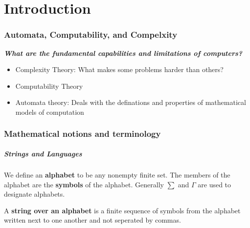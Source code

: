 \chapter{Introduction}

\subsection{Automata, Computability, and Compelxity}

\textit{\textbf{What are the fundamental capabilities and limitations of 
computers?}}\\

\begin{itemize}
    \item Complexity Theory: What makes some problems harder than others?
    \item Computability Theory
    \item Automata theory: Deals with the definations and properties of
        mathematical models of computation
\end{itemize}

\subsection{Mathematical notions and terminology}

\paragraph{Strings and Languages}

We define an \textbf{alphabet} to be any nonempty finite set. The members of
the alphabet are the \textbf{symbols} of the alphabet. Generally $\sum$ and 
$\Gamma$ are used to designate alphabets.

A \textbf{string over an alphabet} is a finite sequence of symbols from the
alphabet written next to one another and not seperated by commas.
